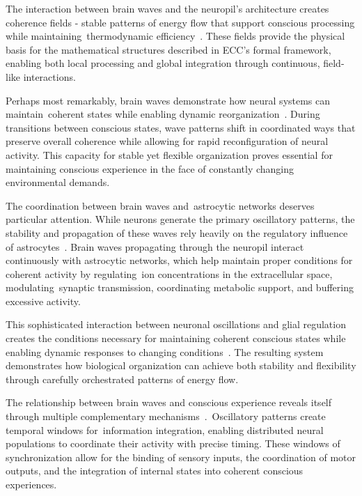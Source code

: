 The interaction between brain waves and the neuropil's architecture creates coherence fields - stable patterns of energy flow that support conscious processing while maintaining~thermodynamic efficiency~\cite{Fries2015, hunt2024electromagnetic}. These fields provide the physical basis for the mathematical structures described in ECC's formal framework, enabling both local processing and global integration through continuous, field-like interactions.

Perhaps most remarkably, brain waves demonstrate how neural systems can maintain~coherent states while enabling dynamic reorganization~\cite{Engel2001, Wang2020}. During transitions between conscious states, wave patterns shift in coordinated ways that preserve overall coherence while allowing for rapid reconfiguration of neural activity. This capacity for stable yet flexible organization proves essential for maintaining conscious experience in the face of constantly changing environmental demands.

The coordination between brain waves and~astrocytic networks deserves particular attention. While neurons generate the primary oscillatory patterns, the stability and propagation of these waves rely heavily on the regulatory influence of astrocytes~\cite{Ward2003, Verkhratsky2018}. Brain waves propagating through the neuropil interact continuously with astrocytic networks, which help maintain proper conditions for coherent activity by regulating~ion concentrations in the extracellular space, modulating~synaptic transmission, coordinating metabolic support, and buffering excessive activity.

This sophisticated interaction between neuronal oscillations and glial regulation creates the conditions necessary for maintaining coherent conscious states while enabling dynamic responses to changing conditions~\cite{Basar2013, Pannasch2013}. The resulting system demonstrates how biological organization can achieve both stability and flexibility through carefully orchestrated patterns of energy flow.

The relationship between brain waves and conscious experience reveals itself through multiple complementary mechanisms~\cite{Jensen2007, Lisman2013}.~Oscillatory patterns create temporal windows for~information integration, enabling distributed neural populations to coordinate their activity with precise timing. These windows of synchronization allow for the binding of sensory inputs, the coordination of motor outputs, and the integration of internal states into coherent conscious experiences.

